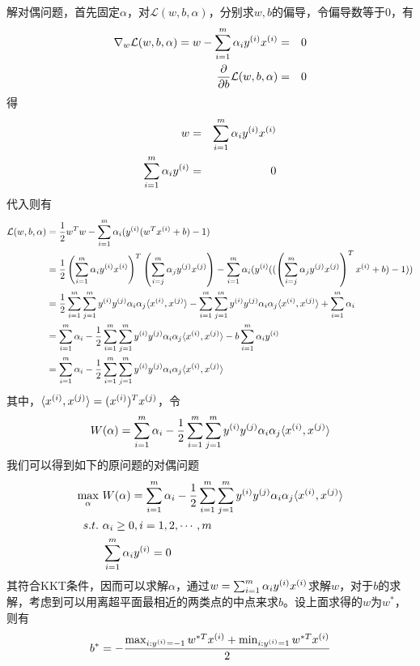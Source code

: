 解对偶问题，首先固定$\alpha$，对$\mathcal{L}(w,b,\alpha)$，分别求$w,b$的偏导，令偏导数等于0，有
\begin{eqnarray}
\nabla_w\mathcal{L}(w,b,\alpha)=w-\sum_{i=1}^m\alpha_i{y}^{({i})}{x}^{({i})}&=&0\\
\frac{\partial}{\partial b}\mathcal{L}(w,b,\alpha)&=&0
\end{eqnarray}
得
\begin{eqnarray}
w&=&\sum_{i=1}^m\alpha_i{y}^{({i})}{x}^{({i})}\\
\sum_{i=1}^m\alpha_i{y}^{({i})}&=&0
\end{eqnarray}
代入则有
\begin{eqnarray}
\begin{aligned}
\mathcal{L}(w,b,\alpha)&=\frac{1}{2}w^Tw-\sum_{i=1}^m\alpha_i({y}^{({i})}(w^T{x}^{({i})}+b)-1)\\
&=\frac{1}{2}\left(\sum_{i=1}^m \alpha_i{y}^{({i})}{x}^{({i})}\right)^T\left(\sum_{i=j}^m \alpha_j{y}^{({j})}{x}^{({j})}\right)-
\sum_{i=1}^m\alpha_i
	( 
	{y}^{({i})} 
		(
			(
				\left(\sum_{i=j}^m \alpha_j{y}^{({j})}{x}^{({j})}\right)^T{x}^{({i})}+b
			)-1
		) 
	)\\
&=\frac{1}{2}\sum_{i=1}^m\sum_{j=1}^m{y}^{({i})}{y}^{({j})}\alpha_i\alpha_j\langle{x}^{({i})},{x}^{({j})}\rangle-\sum_{i=1}^m\sum_{j=1}^m{y}^{({i})}{y}^{({j})}\alpha_i\alpha_j\langle{x}^{({i})},{x}^{({j})}\rangle+\sum_{i=1}^m\alpha_i\\
&=\sum_{i=1}^m\alpha_i-\frac{1}{2}\sum_{i=1}^m\sum_{j=1}^m{y}^{({i})}{y}^{({j})}\alpha_i\alpha_j\langle{x}^{({i})},{x}^{({j})}\rangle-b\sum_{i=1}^m\alpha_i{y}^{({i})}\\
&=\sum_{i=1}^m\alpha_i-\frac{1}{2}\sum_{i=1}^m\sum_{j=1}^m{y}^{({i})}{y}^{({j})}\alpha_i\alpha_j\langle{x}^{({i})},{x}^{({j})}\rangle
\end{aligned}
\end{eqnarray}
其中，$\langle{x}^{({i})},{x}^{({j})}\rangle=({x}^{({i})})^T{x}^{({j})}$，令
\begin{eqnarray}
W(\alpha)=\sum_{i=1}^m\alpha_i-\frac{1}{2}\sum_{i=1}^m\sum_{j=1}^m{y}^{({i})}{y}^{({j})}\alpha_i\alpha_j\langle{x}^{({i})},{x}^{({j})}\rangle
\end{eqnarray}
我们可以得到如下的原问题的对偶问题
\begin{eqnarray}
\begin{aligned}
\max_\alpha&\ W(\alpha)=\sum_{i=1}^m\alpha_i-\frac{1}{2}\sum_{i=1}^m\sum_{j=1}^m\sample{y}{i}\sample{y}{j}\alpha_i\alpha_j\langle\sample{x}{i},\sample{x}{j}\rangle\\
s.t.&\ \alpha_i\geq 0,i=1,2,\cdots,m\\
&\ \sum_{i=1}^m\alpha_i\sample{y}{i}=0
\end{aligned}
\end{eqnarray}
其符合KKT条件，因而可以求解$\alpha$，通过$w=\sum_{i=1}^m\alpha_i{y}^{({i})}{x}^{({i})}$求解$w$，对于$b$的求解，考虑到可以用离超平面最相近的两类点的中点来求$b$。设上面求得的$w$为$w^*$，则有
\begin{eqnarray}
b^*=-\frac{\max_{i:{y}^{({i})}=-1}w^{*T}{x}^{({i})}+\min_{i:{y}^{({i})}=1}w^{*T}{x}^{({i})}}{2}
\end{eqnarray}

